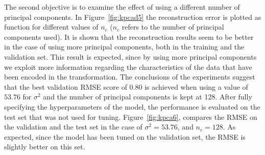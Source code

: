 \documentclass[conference,compsoc]{IEEEtran}
\begin{document}
The second objective is to examine the effect of using a different number of principal components. In Figure~\ref{fig:kpcad5} the reconstruction error is plotted as function for different values of $n_c$ ($n_c$ refers to the number of principal components used). It is shown that the reconstruction results seem to be better in the case of using more principal components, both in the training and the validation set. This result is expected, since by using more principal components we exploit more information regarding the characteristics of the data that have been encoded in the transformation. The conclusions of the experiments suggest that the best validation RMSE score of 0.80 is achieved when using a value of $53.76$ for $\sigma^2$ and the number of principal components is kept at 128. After fully specifying the hyperparameters of the model, the performance is evaluated on the test set that was not used for tuning. Figure~\ref{fig:kpca6}, compares the RMSE on the validation and the test set in the case of $\sigma^2=53.76$, and $n_c = 128$. As expected, since the model has been tuned on the validation set, the RMSE is slightly better on this set.
\end{document}
